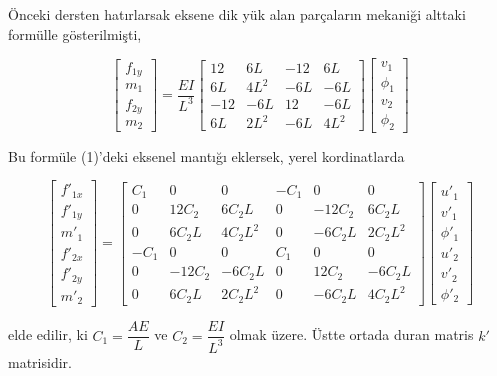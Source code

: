 \documentclass[12pt,fleqn]{article}\usepackage{../../common}
\begin{document}
Önceki dersten hatırlarsak eksene dik yük alan parçaların mekaniği alttaki
formülle gösterilmişti,

$$
\left[\begin{array}{c}
f_{1y} \\ m_1 \\ f_{2y} \\ m_2
\end{array}\right] =
\frac{EI}{L^3}
\left[\begin{array}{cccc}
12 & 6L & -12 & 6L \\
6L & 4L^2 & -6L & -6L \\
-12 & -6L & 12 & -6L \\
6L & 2L^2 & -6L & 4L^2
\end{array}\right]
\left[\begin{array}{ccc}
v_1 \\ \phi_1 \\ v_2 \\ \phi_2
\end{array}\right]
$$

Bu formüle (1)'deki eksenel mantığı eklersek, yerel kordinatlarda

$$
\left[\begin{array}{c}
f'_{1x} \\ f'_{1y} \\ m'_1 \\ f'_{2x} \\ f'_{2y} \\ m'_2
\end{array}\right] =
\left[\begin{array}{cccccc}
C_1 & 0 & 0 & -C_1 & 0 & 0 \\
0 & 12C_2 & 6 C_2 L & 0 & -12 C_2 & 6 C_2 L \\
0 & 6C_2 L & 4 C_2 L^2 & 0 & -6 C_2 L & 2 C_2 L^2 \\
-C_1 & 0 & 0 & C_1 & 0 & 0 \\
0 & -12C_2 & -6 C_2 L & 0 & 12 C_2 & -6 C_2 L \\
0 & 6 C_2 L & 2 C_2 L^2 & 0 & -6C_2 L & 4C_2 L^2
\end{array}\right]
\left[\begin{array}{c}
u'_1 \\ v'_1 \\ \phi'_1 \\ u'_2 \\ v'_2 \\ \phi'_2
\end{array}\right]
$$

elde edilir, ki $C_1 = \dfrac{AE}{L}$ ve $C_2 = \dfrac{EI}{L^3}$
olmak üzere. Üstte ortada duran matris $k'$ matrisidir.
\end{document}

